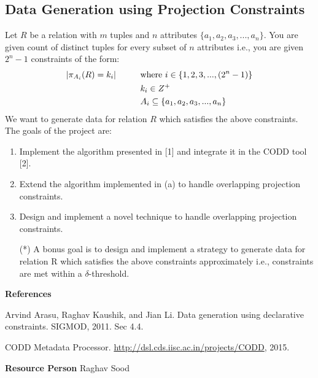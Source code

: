\documentclass[]{article}
\begin{document}
\noindent
{}

\subsection*{Data Generation using Projection Constraints}
Let $R$ be a relation with $m$ tuples and $n$ attributes $\{a_1, a_2, a_3, ... , a_n\}$. You are given count of distinct tuples for every subset of $n$ attributes i.e., you are given $2^n-1$ constraints of the form: 
\begin{align*}
    |\pi_{A_{i}}(R) = k_i| \hspace{10 mm} & \text{where } i \in \{1, 2, 3, ..., (2^n-1)\} \\
        & k_i \in Z^+ \\
        & A_i \subseteq \{a_1, a_2, a_3, ... , a_n\}
\end{align*}
We want to generate data for relation $R$ which satisfies the above constraints. The goals of the project are:
\begin{enumerate}[\hspace{10 mm}(a)]
	\item Implement the algorithm presented in [1] and integrate it in the CODD tool [2]. 
	\item Extend the algorithm implemented in (a) to handle overlapping projection constraints. 
	\item Design and implement a novel technique to handle overlapping projection constraints. 
	\item[\hspace{10 mm}(*)] A bonus goal is to design and implement a strategy to generate data for relation R which satisfies the above constraints approximately i.e., constraints are met within a $\delta$-threshold. 
\end{enumerate}

\textbf{References}
\begin{enumerate}[\hspace{10 mm}{[}1{]}]
	\item Arvind Arasu, Raghav Kaushik, and Jian Li. Data generation using declarative constraints. SIGMOD, 2011. Sec 4.4. 
	\item CODD Metadata Processor. \url{http://dsl.cds.iisc.ac.in/projects/CODD}, 2015.
\end{enumerate}

\textbf{Resource Person} \hspace{10 mm} Raghav Sood


\pagebreak
\end{document}
